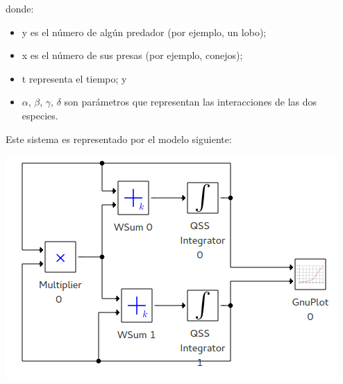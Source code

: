 donde:
\begin{itemize}
	\item y es el número de algún predador (por ejemplo, un lobo);
    \item x es el número de sus presas (por ejemplo, conejos);
    \item t representa el tiempo; y
    \item $\alpha$, $\beta$, $\gamma$, $\delta$ son parámetros que representan las interacciones de las dos especies.
\end{itemize}

	Este sistema es representado por el modelo siguiente:

\includegraphics[width=0.75\linewidth]{lotka_voltera_pwd}

